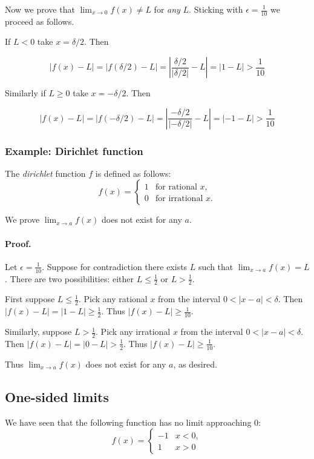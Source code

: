 Now we prove that $\lim_{x\to 0}f(x)\neq L$ for \textit{any} $L$. Sticking
with $\epsilon=\frac{1}{10}$ we proceed as follows.

\vs

If $L<0$ take $x=\delta/2$. Then

\[|f(x)-L|=|f(\delta/2)-L|=\left|\frac{\delta/2}{|\delta/2|}-L\right|=|1-L|>\frac{1}{10}\]

Similarly if $L\geq 0$ take $x=-\delta/2$. Then

\[|f(x)-L|=|f(-\delta/2)-L|=\left|\frac{-\delta/2}{|-\delta/2|}-L\right|=|-1-L|>\frac{1}{10}\]

\subsubsection*{Example: Dirichlet function} \label{subsubsec:dirichlet}
The \textit{dirichlet} function $f$ is defined as follows:
\[
f(x) = 
\begin{cases} 
1 & \text{for rational } x,\\
0 & \text{for irrational } x.
\end{cases}
\]

We prove $\lim_{x\to a}f(x)$ does not exist for any $a$.

\paragraph{Proof.} Let $\epsilon=\frac{1}{10}$. Suppose for contradiction
there exists $L$ such that $\lim_{x\to a}f(x)=L$. There are two
possibilities: either $L\leq\frac{1}{2}$ or $L>\frac{1}{2}$.

\vs

First suppose $L\leq\frac{1}{2}$. Pick any rational $x$ from the interval
$0<|x-a|<\delta$. Then $|f(x)-L|=|1-L|\geq\frac{1}{2}$. Thus
$|f(x)-L|\geq\frac{1}{10}$.

\vs

Similarly, suppose $L>\frac{1}{2}$. Pick any irrational $x$ from the
interval $0<|x-a|<\delta$. Then $|f(x)-L|=|0-L|>\frac{1}{2}$. Thus
$|f(x)-L|\geq\frac{1}{10}$.

\vs

Thus $\lim_{x\to a}f(x)$ does not exist for any $a$, as desired.

\subsection{One-sided limits}\label{subsec:onesided-limits}
We have seen that the following function has no limit approaching $0$:
\[
f(x) = 
\begin{cases} 
-1 & x<0,\\
1 & x>0
\end{cases}
\]

